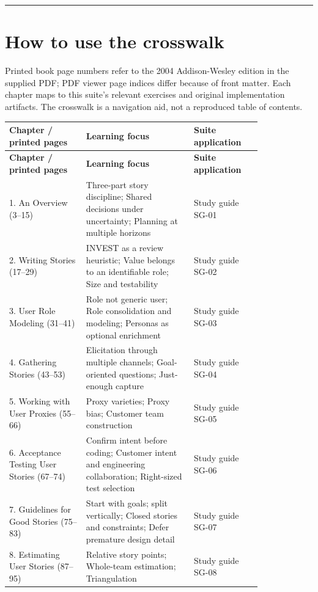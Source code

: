 \documentclass[11pt,letterpaper]{article}
\begin{document}
\tableofcontents\medskip\noindent\rule{\linewidth}{0.4pt}\medskip
\section{How to use the crosswalk}
Printed book page numbers refer to the 2004 Addison-Wesley edition in the supplied PDF; PDF viewer page indices differ because of front matter. Each chapter maps to this suite’s relevant exercises and original implementation artifacts. The crosswalk is a navigation aid, not a reproduced table of contents.

\begin{longtable}{|p{0.25\linewidth}|p{0.35\linewidth}|p{0.22\linewidth}|}\hline
\textbf{Chapter / printed pages} & \textbf{Learning focus} & \textbf{Suite application} \\ \hline\endfirsthead\hline
\textbf{Chapter / printed pages} & \textbf{Learning focus} & \textbf{Suite application} \\ \hline\endhead
1. An Overview (3–15) & Three-part story discipline; Shared decisions under uncertainty; Planning at multiple horizons & Study guide SG-01 \\ \hline
2. Writing Stories (17–29) & INVEST as a review heuristic; Value belongs to an identifiable role; Size and testability & Study guide SG-02 \\ \hline
3. User Role Modeling (31–41) & Role not generic user; Role consolidation and modeling; Personas as optional enrichment & Study guide SG-03 \\ \hline
4. Gathering Stories (43–53) & Elicitation through multiple channels; Goal-oriented questions; Just-enough capture & Study guide SG-04 \\ \hline
5. Working with User Proxies (55–66) & Proxy varieties; Proxy bias; Customer team construction & Study guide SG-05 \\ \hline
6. Acceptance Testing User Stories (67–74) & Confirm intent before coding; Customer intent and engineering collaboration; Right-sized test selection & Study guide SG-06 \\ \hline
7. Guidelines for Good Stories (75–83) & Start with goals; split vertically; Closed stories and constraints; Defer premature design detail & Study guide SG-07 \\ \hline
8. Estimating User Stories (87–95) & Relative story points; Whole-team estimation; Triangulation & Study guide SG-08 \\ \hline

\end{longtable}
\end{document}
